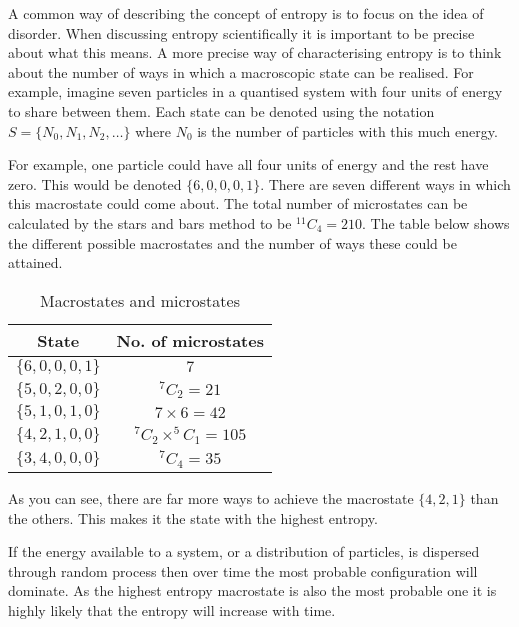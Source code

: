 \documentclass[revision-guide.tex]{subfiles}
\begin{document}
A common way of describing the concept of entropy is to focus on the idea of disorder. When discussing entropy scientifically it is important to be precise about what this means. A more precise way of characterising entropy is to think about the number of ways in which a macroscopic state can be realised. For example, imagine seven particles in a quantised system with four units of energy to share between them. Each state can be denoted using the notation $S = \{N_0,N_1,N_2,\ldots\}$ where $N_0$ is the number of particles with this much energy.

For example, one particle could have all four units of energy and the rest have zero. This would be denoted $\{6,0,0,0,1\}$. There are seven different ways in which this macrostate could come about. The total number of microstates can be calculated by the stars and bars method to be $^{11}C_4=210$. The table below shows the different possible macrostates and the number of ways these could be attained.

\begin{table}[h]
\begin{center}
  \begin{tabular}{c|c}
    \textbf{State} & \textbf{No. of microstates} \\ \hline
    $\{6,0,0,0,1\}$ & $ 7$ \\
	$\{5,0,2,0,0\}$ & $^7C_2=21$\\
    $\{5,1,0,1,0\}$ &  $7 \times 6 = 42$ \\
    $\{4,2,1,0,0\}$ & $ ^7C_2\times ^5C_1 = 105$ \\
    $\{3,4,0,0,0\}$ & $^7C_4=35$
  \end{tabular}
\end{center}
  \caption{Macrostates and microstates}
  \label{tbl:macro}
\end{table}

As you can see, there are far more ways to achieve the macrostate $\{4,2,1\}$ than the others. This makes it the state with the highest entropy.


If the energy available to a system, or a distribution of particles, is dispersed through random process then over time the most probable configuration will dominate. As the highest entropy macrostate is also the most probable one it is highly likely that the entropy will increase with time.
\end{document}

